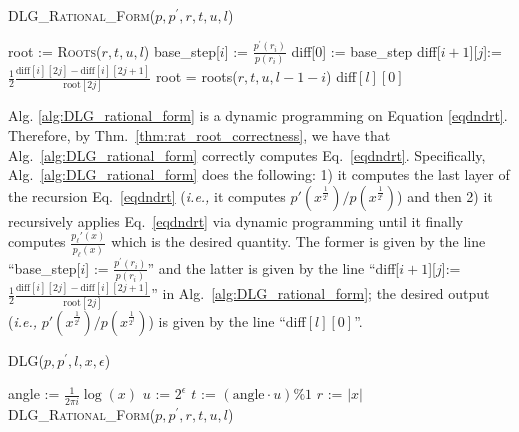 \documentclass[runningheads]{llncs}
\begin{document}
\begin{algorithm}
\caption{\textsc{DLG\_Rational\_Form}($p,p^\prime,r,t,u,l$)}
\label{alg:DLG_rational_form}
\begin{algorithmic}
\STATE 	root      := \textsc{Roots}($r,t,u,l$)
\STATE 	base\_step[$i$] := $\frac{p^\prime(r_i)}{p(r_i)}$
\ENDFOR
\STATE  diff[0]   := base\_step
\STATE 			diff[$i+1$][$j$]:=$\frac{1}{2}\frac{\text{diff}[i][2j]-\text{diff}[i][2j+1]}{\text{root}[2j]}$
\STATE 		root = roots($r,t,u,l-1-i$)
\ENDFOR
\ENDFOR
\RETURN diff$[l][0]$
\end{algorithmic}
\end{algorithm}
Alg. \ref{alg:DLG_rational_form} is a dynamic programming on Equation \ref{eqdndrt}. Therefore, by Thm.~\ref{thm:rat_root_correctness}, we have that Alg.~\ref{alg:DLG_rational_form} correctly computes Eq.~\ref{eqdndrt}.
Specifically, Alg.~\ref{alg:DLG_rational_form} does the following: 1) it computes the last layer of the recursion Eq.~\ref{eqdndrt} (\emph{i.e.,} it computes $p'(x^{\frac{1}{2^l}})/p(x^{\frac{1}{2^l}})$) and then 2) it recursively applies Eq.~\ref{eqdndrt} via dynamic programming until it finally computes $\frac{p_{\ell}'(x)}{p_{\ell}(x)}$ which is the desired quantity.
The former is given by the line ``base\_step[$i$] := $\frac{p^\prime(r_i)}{p(r_i)}$'' and the latter is given by the line ``diff[$i+1$][$j$]:=$\frac{1}{2}\frac{\text{diff}[i][2j]-\text{diff}[i][2j+1]}{\text{root}[2j]}$'' in Alg.~\ref{alg:DLG_rational_form}; the desired output (\emph{i.e.,} $p'(x^{\frac{1}{2^l}})/p(x^{\frac{1}{2^l}})$) is given by the line ``diff$[l][0]$''.




\begin{algorithm}
\caption{\textsc{DLG}($p,p^\prime,l,x, \epsilon$)}
\label{alg:rational_angle_approx}
\begin{algorithmic}
\STATE angle     := $\frac{1}{2\pi i} \log (x)$
\STATE $u $    := $2^{\epsilon}$
\STATE$t$      :=  $(\text{angle} \cdot u)\% 1$
\STATE $r$      := $|x|$
\RETURN \textsc{DLG\_Rational\_Form}($p,p^\prime,r,t,u,l$)
\end{algorithmic}
\end{algorithm}

%




\end{document}
